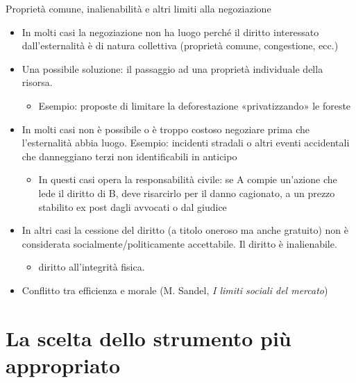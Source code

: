 \documentclass[aspectratio=64,12pt]{beamer}
\begin{document}
\begin{frame}{Proprietà comune, inalienabilità e altri limiti alla negoziazione}
\begin{itemize}
\item In molti casi la negoziazione non ha luogo perché il diritto interessato
dall'esternalità è di natura collettiva (proprietà comune, congestione,
ecc.)
\item Una possibile soluzione: il passaggio ad una proprietà individuale della
risorsa.
\begin{itemize}
\item Esempio: proposte di limitare la deforestazione «privatizzando» le foreste
\end{itemize}
\item In molti casi non è possibile o è troppo costoso negoziare prima che
l'esternalità abbia luogo. Esempio: incidenti stradali o altri eventi
accidentali che danneggiano terzi non identificabili in anticipo
\begin{itemize}
\item In questi casi opera la responsabilità civile: se A compie un'azione che
lede il diritto di B, deve risarcirlo per il danno cagionato, a un prezzo
stabilito ex post dagli avvocati o dal giudice
\end{itemize}
\item In altri casi la cessione del diritto (a titolo oneroso ma anche gratuito)
non è considerata socialmente/politicamente accettabile. Il diritto è
inalienabile.
\begin{itemize}
\item diritto all'integrità fisica.
\end{itemize}
\item Conflitto tra efficienza e morale (M. Sandel, \emph{I limiti sociali del mercato})
\end{itemize}
\end{frame}

\section{La scelta dello strumento più appropriato}
\end{document}

